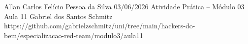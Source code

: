 \documentclass{article}
\begin{document}
{Allan Carlos Felício Pessoa da Silva}
{03/06/2026}
{Atividade Prática -- Módulo 03}
{Aula 11}
{Gabriel dos Santos Schmitz}
{https://github.com/gabrielzschmitz/uni/tree/main/hackers-do-bem/especializacao-red-team/modulo3/aula11}




\newpage
\printbibliography[title=Referências]
\end{document}
